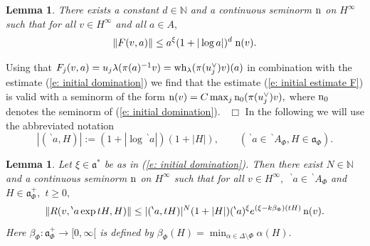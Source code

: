 \documentclass[12pt,a4paper]{article}
\newtheorem{Lemma}[Thm]{Lemma}
\newenvironment{lemma}[0]{\begin{Lemma}\noindent}%
{\end{Lemma}}
\def\proof{\par\noindent{\it Proof.}{\ }{\ }}
\def\qed{~\hfill\hbox{$\Box$}\medbreak}
\def\qquad{\quad\quad}
\def\msy#1{{\mathbb #1}}
\def\N{{\msy N}}
\def\ga{\alpha}
\def\gb{\beta}
\def\gl{\lambda}
\def\gD{\Delta}
\def\got#1{\mathfrak #1}
\def\fa{{\got a}}
\def\to{\rightarrow}
\numberwithin{Thm}{section}
\numberwithin{equation}{section}
\numberwithin{equation}{section}
\def\bp{\!{\,}^\backprime}
\def\wh{{\rm wh}}
\def\veec{\vee}%
\begin{document}
\begin{lemma}
There exists a constant $d \in \N$ and a continuous seminorm ${\rm n}$ on $H^\infty$ such that for all $v \in H^\infty$ and
all $a \in A,$ 
\begin{equation}
\label{e: initial estimate F}
\|F(v, a)\| \leq a^\xi (1 + |\log a|)^d \; { \rm n}(v).
\end{equation}
\end{lemma}
\proof 
Using that $F_j(v,a ) = u_j \gl (\pi(a)^{-1} v) = \wh_\gl(\pi(u_j^\veec) v)(a)$ 
in combination with the estimate (\ref{e: initial domination}) we find that
the estimate (\ref{e: initial estimate F}) is valid with a seminorm of the 
form ${\rm n}(v) = C \max_j {\rm n}_0(\pi(u_j^\veec)v),$ where 
 ${\rm n}_0$ denotes the seminorm of (\ref{e: initial domination}).
\qed
In the following we will use the abbreviated notation
$$ 
|(\bp a, H)| := (1 + |\log \bp a|)(1 + |H|) , \qquad (\bp a \in \bp A_\Phi, H \in \fa_\Phi).
$$%
\begin{lemma}
\label{l: initial estimate R}
Let $\xi \in \fa^*$ be as in (\ref{e: initial domination}).
Then
there exist $N \in \N$ and a continuous seminorm ${\rm n}$ on $H^\infty$ 
such that for all $v \in H^\infty,$ $\bp a \in \bp A_\Phi$ and $H \in \fa_\Phi^+,$ $t \geq 0,$ 
\begin{equation}
\label{e: first estimation R}
\|R(v, \bp a \exp tH, H)\| \leq  |(\bp a, tH)|^N (1 + |H|)(\bp a)^\xi e^{(\xi -k\gb_\Phi)(tH)}
\, {\rm n }(v).
\end{equation}
Here $\gb_\Phi: \fa_\Phi^+ \to [0,\infty[$ is defined by 
$
\gb_\Phi(H) = \min_{\ga \in \gD\setminus \Phi} \ga(H).
$ 
\end{lemma}
\end{document}
